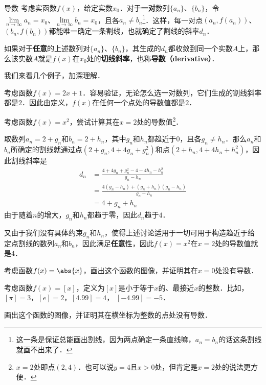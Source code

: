 \begin{definition}{导数}\label{Der_def1}
考虑实函数$f(x)$，给定实数$x_0$．对于\textbf{一对}数列$\{a_n\}$、$\{b_n\}$，令$\lim\limits_{n\to\infty}a_n=x_0$、$\lim\limits_{n\to\infty}b_n=x_0$，且各$a_n\not=b_n$\footnote{这一条是保证总能画出割线，因为两点确定一条直线嘛，$a_n=b_n$的话这条割线就画不出来了．}．这样，每一对点$(a_n, f(a_n))$、$ (b_n, f(b_n))$都能唯一确定一条割线，也就确定了割线的斜率$d_n$．

如果对于\textbf{任意}的上述数列对$\{a_n\}$、$\{b_n\}$，其生成的$d_n$都收敛到同一个实数$A$上，那么该实数$A$就是$f(x)$在$x_0$处的\textbf{切线斜率}，也称\textbf{导数（derivative）}．
\end{definition}

我们来看几个例子，加深理解．

\begin{example}{}
考虑函数$f(x)=2x+1$．容易验证，无论怎么选一对数列，它们生成的割线斜率都是$2$．因此由定义，$f(x)$在任何一个点处的导数值都是$2$．
\end{example}

\begin{example}{}\label{Der_ex1}
考虑函数$f(x)=x^2$，尝试计算其在$x=2$处的导数值\footnote{$x=2$处即点$(2, 4)$．也可以说$y=4$且$x>0$处，但肯定是$x=2$处的说法更方便．}．

取数列$a_n=2+g_n$和$b_n=2+h_n$，其中$g_n$和$h_n$都趋近于$0$，且各$g_n\not=h_n$．那么$a_n$和$b_n$所确定的割线就通过点$(2+g_n, 4+4g_n+g_n^2)$和点$(2+h_n, 4+4h_n+h_n^2)$，因此割线斜率是
\begin{equation}
\begin{aligned}
d_n&=\frac{4+4g_n+g_n^2-4-4h_n-h_n^2}{g_n-h_n}\\
&=\frac{4(g_n-h_n)+(g_n+h_n)(g_n-h_n)}{g_n-h_n}\\
&=4+g_n+h_n
\end{aligned}
\end{equation}
由于随着$n$的增大，$g_n$和$h_n$都趋于零，因此$d_n$趋于$4$．

又由于我们没有具体约束$g_n$和$h_n$，使得上述讨论适用于一切可用于构造趋近于给定点割线的数列$a_n$和$b_n$，因此满足\textbf{任意}性，因此$f(x)=x^2$在$x=2$处的导数值就是$4$．
\end{example}

\begin{exercise}{}
考虑函数$f(x)=\abs{x}$，画出这个函数的图像，并证明其在$x=0$处没有导数．
\end{exercise}

\begin{exercise}{}
考虑函数$f(x)=[x]$，定义为$[x]$是小于等于$x$的、最接近$x$的整数．比如，$[\pi]=3$，$[e]=2$，$[4.99]=4$， $[-4.99]=-5$．

画出这个函数的图像，并证明其在横坐标为整数的点处没有导数．
\end{exercise}








